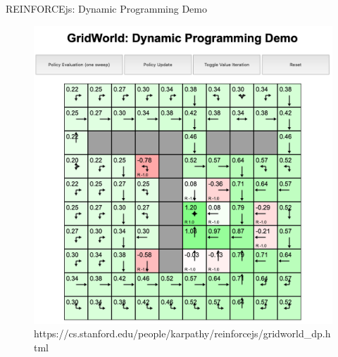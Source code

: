 \documentclass{beamer}
\begin{document}
\begin{frame}{REINFORCEjs: Dynamic Programming Demo}
\begin{figure}[htpb]
    \centering
    \includegraphics[width=0.6\linewidth]{pic/jsgrid.png}
    \tiny{https://cs.stanford.edu/people/karpathy/reinforcejs/gridworld\_dp.html}
\end{figure}
\end{frame}
%
%
%
%
%
%
\end{document}
